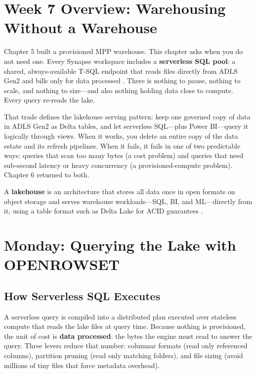 \section{Week 7 Overview: Warehousing Without a Warehouse}
Chapter 5 built a provisioned MPP warehouse. This chapter asks when you do not need one. Every Synapse workspace includes a \textbf{serverless SQL pool}: a shared, always-available T-SQL endpoint that reads files directly from ADLS Gen2 and bills only for data processed \cite{microsoft2025synapseServerless}. There is nothing to pause, nothing to scale, and nothing to size---and also nothing holding data close to compute. Every query re-reads the lake.

That trade defines the lakehouse serving pattern: keep one governed copy of data in ADLS Gen2 as Delta tables, and let serverless SQL---plus Power BI---query it logically through views. When it works, you delete an entire copy of the data estate and its refresh pipelines. When it fails, it fails in one of two predictable ways: queries that scan too many bytes (a cost problem) and queries that need sub-second latency or heavy concurrency (a provisioned-compute problem). Chapter 6 returned to both.

\begin{definitionbox}
A \textbf{lakehouse} is an architecture that stores all data once in open formats on object storage and serves warehouse workloads---SQL, BI, and ML---directly from it, using a table format such as Delta Lake for ACID guarantees \cite{armbrust2021lakehouse}.
\end{definitionbox}

\section{Monday: Querying the Lake with OPENROWSET}

\subsection{How Serverless SQL Executes}
A serverless query is compiled into a distributed plan executed over stateless compute that reads the lake files at query time. Because nothing is provisioned, the unit of cost is \textbf{data processed}: the bytes the engine must read to answer the query. Three levers reduce that number: columnar formats (read only referenced columns), partition pruning (read only matching folders), and file sizing (avoid millions of tiny files that force metadata overhead).

